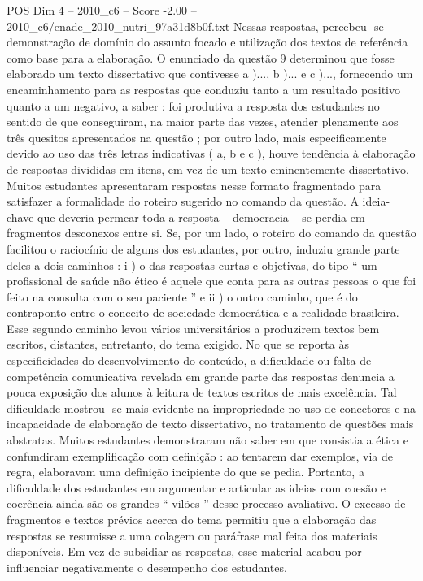 \begin{textsample}{POS Dim 4 – 2010\_c6 – Score -2.00 – 2010\_c6/enade\_2010\_nutri\_97a31d8b0f.txt}
Nessas respostas, percebeu -se demonstração de domínio do assunto focado e utilização dos textos de referência como base para a elaboração.
O enunciado da questão 9 determinou que fosse elaborado um texto dissertativo que contivesse a )..., b )... e c )..., fornecendo um encaminhamento para as respostas que conduziu tanto a um resultado positivo quanto a um negativo, a saber : foi produtiva a resposta dos estudantes no sentido de que conseguiram, na maior parte das vezes, atender plenamente aos três quesitos apresentados na questão ; por outro lado, mais especificamente devido ao uso das três letras indicativas ( a, b e c ), houve tendência à elaboração de respostas divididas em itens, em vez de um texto eminentemente dissertativo.
Muitos estudantes apresentaram respostas nesse formato fragmentado para satisfazer a formalidade do roteiro sugerido no comando da questão.
A ideia-chave que deveria permear toda a resposta – democracia – se perdia em fragmentos desconexos entre si.
Se, por um lado, o roteiro do comando da questão facilitou o raciocínio de alguns dos estudantes, por outro, induziu grande parte deles a dois caminhos : i ) o das respostas curtas e objetivas, do tipo “ um profissional de saúde não ético é aquele que conta para as outras pessoas o que foi feito na consulta com o seu paciente ” e ii ) o outro caminho, que é do contraponto entre o conceito de sociedade democrática e a realidade brasileira.
Esse segundo caminho levou vários universitários a produzirem textos bem escritos, distantes, entretanto, do tema exigido.
No que se reporta às especificidades do desenvolvimento do conteúdo, a dificuldade ou falta de competência comunicativa revelada em grande parte das respostas denuncia a pouca exposição dos alunos à leitura de textos escritos de mais excelência.
Tal dificuldade mostrou -se mais evidente na impropriedade no uso de conectores e na incapacidade de elaboração de texto dissertativo, no tratamento de questões mais abstratas.
Muitos estudantes demonstraram não saber em que consistia a ética e confundiram exemplificação com definição : ao tentarem dar exemplos, via de regra, elaboravam uma definição incipiente do que se pedia.
Portanto, a dificuldade dos estudantes em argumentar e articular as ideias com coesão e coerência ainda são os grandes “ vilões ” desse processo avaliativo.
O excesso de fragmentos e textos prévios acerca do tema permitiu que a elaboração das respostas se resumisse a uma colagem ou paráfrase mal feita dos materiais disponíveis.
Em vez de subsidiar as respostas, esse material acabou por influenciar negativamente o desempenho dos estudantes.

\end{textsample}
